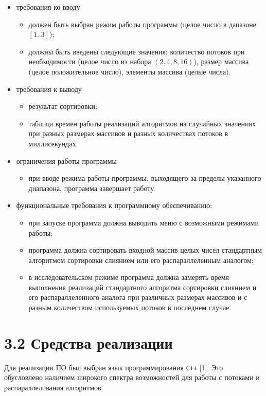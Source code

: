 \documentclass[12pt, a4paper]{report}
\begin{document}
\begin{itemize}
	\item требования ко вводу
	\begin{itemize}
		\item должен быть выбран режим работы программы (целое число в дапазоне $[1..3]$);
		\item должны быть введены следующие значения: количество потоков при необходимости (целое число из набора $(2, 4, 8, 16)$), размер массива (целое положительное число), элементы массива (целые числа).
	\end{itemize}
	\item требования к выводу
	\begin{itemize}
		\item результат сортировки;
		\item таблица времен работы реализаций алгоритмов на случайных значениях при разных размерах массивов и разных количествах потоков в миллисекундах.
	\end{itemize}
	\item ограничения работы программы
	\begin{itemize}
		\item при вводе режима работы программы, выходящего за пределы указанного диапазона, программа завершает работу.
	\end{itemize}
	\item функциональные требования к программному обеспечиванию:
	\begin{itemize}
		\item при запуске программа должна выводить меню с возможными режимами работы;
		\item программа должна сортировать входной массив целых чисел стандартным алгоритмом сортировки слиянием или его распараллеленным аналогом;
		\item в исследовательском режиме программа должна замерять время выполнения реализаций стандартного алгоритма сортировки слиянием и его распараллеленного аналога при различных размерах массивов и с разным количеством используемых потоков в последнем случае.
	\end{itemize}
\end{itemize}

\section*{3.2 Средства реализации}

Для реализации ПО был выбран язык программирования \verb|С++| [1]. Это обусловлено наличием широкого спектра возможностей для работы с потоками и распараллеливания алгоритмов. 
\end{document}

